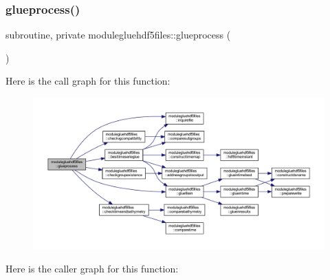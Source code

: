 \subsubsection{\texorpdfstring{glueprocess()}{glueprocess()}}
{\footnotesize\ttfamily subroutine, private modulegluehdf5files\+::glueprocess (\begin{DoxyParamCaption}{ }\end{DoxyParamCaption})\hspace{0.3cm}{\ttfamily [private]}}

Here is the call graph for this function\+:\nopagebreak
\begin{figure}[H]
\begin{center}
\leavevmode
\includegraphics[width=350pt]{namespacemodulegluehdf5files_acbfe773d67d0b68688bd5a0cf161456c_cgraph}
\end{center}
\end{figure}
Here is the caller graph for this function\+:\nopagebreak

